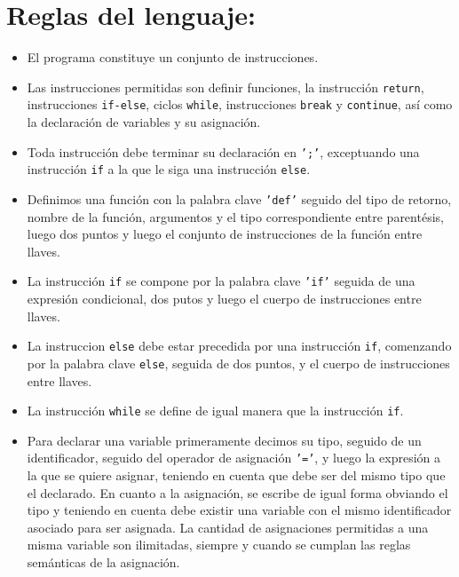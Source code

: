 \documentclass[twoside]{article}
\begin{document}
		\newpage
		
		
		
		\section{Reglas del lenguaje:}
		\begin{itemize}
			\item El programa constituye un conjunto de instrucciones.
			
			\item Las instrucciones permitidas son definir funciones, la instrucci\'on \texttt{return}, instrucciones \texttt{if-else}, ciclos \texttt{while}, instrucciones \texttt{break} y \texttt{continue}, as\'i como la declaraci\'on de variables y su asignaci\'on.
			
			\item Toda instrucci\'on debe terminar su declaraci\'on en \texttt{';'}, exceptuando una instrucci\'on \texttt{if} a la que le siga una instrucci\'on \texttt{else}.
			
			\item Definimos una funci\'on con la palabra clave \texttt{'def'} seguido del tipo de retorno, nombre de la funci\'on, argumentos y el tipo correspondiente entre parent\'esis, luego dos puntos y luego el conjunto de instrucciones de la funci\'on entre llaves.
			
			\item La instrucci\'on \texttt{if} se compone por la palabra clave \texttt{'if'} seguida de una expresi\'on condicional, dos putos y luego el cuerpo de instrucciones  entre llaves.
			
			\item La instruccion \texttt{else} debe estar precedida por una instrucci\'on \texttt{if}, comenzando por la palabra clave \texttt{else}, seguida de dos puntos, y el cuerpo de instrucciones entre llaves.
			
			\item La instrucci\'on \texttt{while} se define de igual manera que la instrucci\'on \texttt{if}.
			
			\item Para declarar una variable primeramente decimos su tipo, seguido de un identificador, seguido del operador de asignaci\'on \texttt{'='}, y luego la expresi\'on a la que se quiere asignar, teniendo en cuenta que debe ser del mismo tipo que el declarado.  En cuanto a la asignaci\'on, se escribe de igual forma obviando el tipo y teniendo en cuenta debe existir una variable con el mismo identificador asociado para ser asignada. La cantidad de asignaciones permitidas a una misma variable son ilimitadas, siempre y cuando se cumplan las reglas sem\'anticas de la asignaci\'on.
			

\end{itemize}
\end{document}
